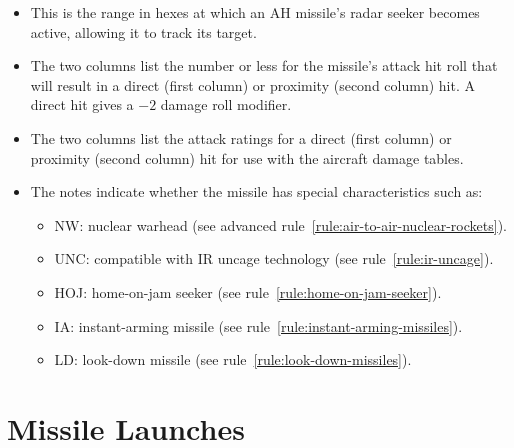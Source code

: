 {\begin{itemize}
    \item {} This is the range in hexes at which an AH missile's radar seeker becomes active, allowing it to track its target.

    \item {} The two columns list the number or less for the missile's attack hit roll that will result in a direct (first column) or proximity (second column) hit. A direct hit gives a $-2$ damage roll modifier.

    \item {} The two columns list the attack ratings for a direct (first column) or proximity (second column) hit for use with the aircraft damage tables.

    \item {} The notes indicate whether the missile has special characteristics such as:
    \begin{itemize}
        \item NW: nuclear warhead (see advanced rule~\ref{rule:air-to-air-nuclear-rockets}).
    \item UNC: compatible with IR uncage technology (see rule~\ref{rule:ir-uncage}).
    \item HOJ: home-on-jam seeker (see rule~\ref{rule:home-on-jam-seeker}).
    \item IA: instant-arming missile (see rule~\ref{rule:instant-arming-missiles}).
    \item LD: look-down missile (see rule~\ref{rule:look-down-missiles}).
    
    \end{itemize}

\end{itemize}
}

\section{Missile Launches}
\label{rule:missile-launches}



